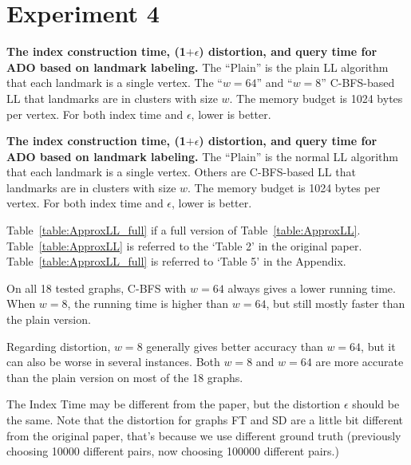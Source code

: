 \documentclass{article}
\begin{document}
\section{Experiment 4}

\begin{table}[htbp]
  \centering
  \footnotesize
  
  \caption{
    \small\textbf{The index construction time, (1$+\epsilon$) distortion, and query time for ADO
    based on landmark labeling.} The ``Plain'' is the plain LL algorithm that each landmark is a single vertex. The ``$w=64$'' and ``$w=8$'' C-BFS-based LL that landmarks are in clusters with size $w$.
    The memory budget is 1024 bytes per vertex. For both index time and $\epsilon$, lower is better. 
    \label{table:ApproxLL}
  }
\end{table}

\begin{table}[htbp]
  \centering
  \small
  
  \caption{
    \small\textbf{The index construction time, (1$+\epsilon$) distortion, and query time for ADO
    based on landmark labeling.} The ``Plain'' is the normal LL algorithm that each landmark is a single vertex. Others are C-BFS-based LL that landmarks are in clusters with size $w$.
    The memory budget is 1024 bytes per vertex. For both index time and $\epsilon$, lower is better. 
    \label{table:ApproxLL_full}
  }
\end{table}

Table~\ref{table:ApproxLL_full} if a full version of Table~\ref{table:ApproxLL}.  Table~\ref{table:ApproxLL} is referred to the  `Table 2' in the original paper. Table~\ref{table:ApproxLL_full} is referred to `Table 5' in the Appendix.  

On all 18 tested graphs, C-BFS with $w=64$ always gives a lower running time. When $w=8$, the running time is higher than $w=64$, but still mostly faster than the plain version. 

Regarding distortion, $w=8$ generally gives better accuracy than $w=64$, but it can also be worse in several instances. Both $w=8$ and $w = 64$ are more accurate than the plain version on most of the 18 graphs. 

The Index Time may be different from the paper, but the distortion $\epsilon$ should be the same.  Note that the distortion for graphs FT and SD are a little bit different from the original paper, that's because we use different ground truth (previously choosing 10000 different pairs, now choosing 100000 different pairs.)
\end{document}
